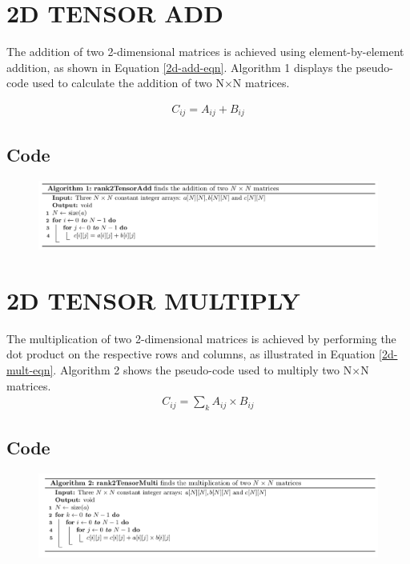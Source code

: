 \section{2D TENSOR ADD}
The addition of two 2-dimensional matrices is achieved using element-by-element addition, as shown in Equation \ref{2d-add-eqn}. Algorithm 1 displays the pseudo-code used to calculate the addition of two N$\times$N matrices.

\begin{align}
C_{ij} = A_{ij} + B_{ij} \label{2d-add-eqn}
\end{align}
\subsection{Code}
\begin{figure}[h!]
\includegraphics[width=\textwidth]{build/Algo1.png}
\end{figure}
\section{2D TENSOR MULTIPLY}
The multiplication of two 2-dimensional matrices is achieved by performing the dot product on the respective
rows and columns, as illustrated in Equation \ref{2d-mult-eqn}. Algorithm 2 shows the pseudo-code used to multiply two N$\times$N matrices.
\begin{align}
C_{ij} = \sum_{k} A_{ij} \times B_{ij} \label{2d-mult-eqn}
\end{align}

\subsection{Code}
\begin{figure}[!h]
\includegraphics[width=\textwidth]{build/Algo2.png}
\end{figure}
